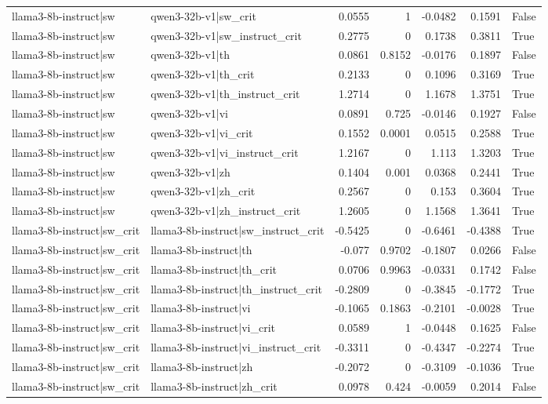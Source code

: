 \begin{table}
\begin{tabular}{l l r r r r l}
llama3-8b-instruct|sw & qwen3-32b-v1|sw_crit & 0.0555 & 1 & -0.0482 & 0.1591 & False \\
llama3-8b-instruct|sw & qwen3-32b-v1|sw_instruct_crit & 0.2775 & 0 & 0.1738 & 0.3811 & True \\
llama3-8b-instruct|sw & qwen3-32b-v1|th & 0.0861 & 0.8152 & -0.0176 & 0.1897 & False \\
llama3-8b-instruct|sw & qwen3-32b-v1|th_crit & 0.2133 & 0 & 0.1096 & 0.3169 & True \\
llama3-8b-instruct|sw & qwen3-32b-v1|th_instruct_crit & 1.2714 & 0 & 1.1678 & 1.3751 & True \\
llama3-8b-instruct|sw & qwen3-32b-v1|vi & 0.0891 & 0.725 & -0.0146 & 0.1927 & False \\
llama3-8b-instruct|sw & qwen3-32b-v1|vi_crit & 0.1552 & 0.0001 & 0.0515 & 0.2588 & True \\
llama3-8b-instruct|sw & qwen3-32b-v1|vi_instruct_crit & 1.2167 & 0 & 1.113 & 1.3203 & True \\
llama3-8b-instruct|sw & qwen3-32b-v1|zh & 0.1404 & 0.001 & 0.0368 & 0.2441 & True \\
llama3-8b-instruct|sw & qwen3-32b-v1|zh_crit & 0.2567 & 0 & 0.153 & 0.3604 & True \\
llama3-8b-instruct|sw & qwen3-32b-v1|zh_instruct_crit & 1.2605 & 0 & 1.1568 & 1.3641 & True \\
llama3-8b-instruct|sw_crit & llama3-8b-instruct|sw_instruct_crit & -0.5425 & 0 & -0.6461 & -0.4388 & True \\
llama3-8b-instruct|sw_crit & llama3-8b-instruct|th & -0.077 & 0.9702 & -0.1807 & 0.0266 & False \\
llama3-8b-instruct|sw_crit & llama3-8b-instruct|th_crit & 0.0706 & 0.9963 & -0.0331 & 0.1742 & False \\
llama3-8b-instruct|sw_crit & llama3-8b-instruct|th_instruct_crit & -0.2809 & 0 & -0.3845 & -0.1772 & True \\
llama3-8b-instruct|sw_crit & llama3-8b-instruct|vi & -0.1065 & 0.1863 & -0.2101 & -0.0028 & True \\
llama3-8b-instruct|sw_crit & llama3-8b-instruct|vi_crit & 0.0589 & 1 & -0.0448 & 0.1625 & False \\
llama3-8b-instruct|sw_crit & llama3-8b-instruct|vi_instruct_crit & -0.3311 & 0 & -0.4347 & -0.2274 & True \\
llama3-8b-instruct|sw_crit & llama3-8b-instruct|zh & -0.2072 & 0 & -0.3109 & -0.1036 & True \\
llama3-8b-instruct|sw_crit & llama3-8b-instruct|zh_crit & 0.0978 & 0.424 & -0.0059 & 0.2014 & False \\

\end{tabular}
\end{table}

